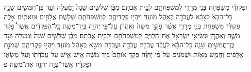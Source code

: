 \documentclass{openreader}
\begin{document}
וּפְקוּדֵ֕י מִשְׁפְּחֹ֖ת בְּנֵ֣י מְרָרִ֑י לְמִשְׁפְּחֹתָ֖ם לְבֵ֥ית אֲבֹתָֽם׃ 
מִבֶּ֨ן שְׁלֹשִׁ֤ים שָׁנָה֙ וָמַ֔עְלָה וְעַ֖ד בֶּן־חֲמִשִּׁ֣ים שָׁנָ֑ה כָּל־הַבָּא֙ לַצָּבָ֔א לַעֲבֹדָ֖ה בְּאֹ֥הֶל מֹועֵֽד׃ 
וַיִּהְי֥וּ פְקֻדֵיהֶ֖ם לְמִשְׁפְּחֹתָ֑ם שְׁלֹ֥שֶׁת אֲלָפִ֖ים וּמָאתָֽיִם׃ 
אֵ֣לֶּה פְקוּדֵ֔י מִשְׁפְּחֹ֖ת בְּנֵ֣י מְרָרִ֑י אֲשֶׁ֨ר פָּקַ֤ד מֹשֶׁה֙ וְאַהֲרֹ֔ן עַל־פִּ֥י יְהוָ֖ה בְּיַד־מֹשֶֽׁה׃ 
כָּֽל־הַפְּקֻדִ֡ים אֲשֶׁר֩ פָּקַ֨ד מֹשֶׁ֧ה וְאַהֲרֹ֛ן וּנְשִׂיאֵ֥י יִשְׂרָאֵ֖ל אֶת־הַלְוִיִּ֑ם לְמִשְׁפְּחֹתָ֖ם וּלְבֵ֥ית אֲבֹתָֽם׃ 
מִבֶּ֨ן שְׁלֹשִׁ֤ים שָׁנָה֙ וָמַ֔עְלָה וְעַ֖ד בֶּן־חֲמִשִּׁ֣ים שָׁנָ֑ה כָּל־הַבָּ֗א לַעֲבֹ֨ד עֲבֹדַ֧ת עֲבֹדָ֛ה וַעֲבֹדַ֥ת מַשָּׂ֖א בְּאֹ֥הֶל מֹועֵֽד׃ 
וַיִּהְי֖וּ פְּקֻדֵיהֶ֑ם שְׁמֹנַ֣ת אֲלָפִ֔ים וַחֲמֵ֥שׁ מֵאֹ֖ות וּשְׁמֹנִֽים׃ 
עַל־פִּ֨י יְהוָ֜ה פָּקַ֤ד אֹותָם֙ בְּיַד־מֹשֶׁ֔ה אִ֥ישׁ אִ֛ישׁ עַל־עֲבֹדָתֹ֖ו וְעַל־מַשָּׂאֹ֑ו וּפְקֻדָ֕יו אֲשֶׁר־צִוָּ֥ה יְהוָ֖ה אֶת־מֹשֶֽׁה׃ פ 
\end{document}
